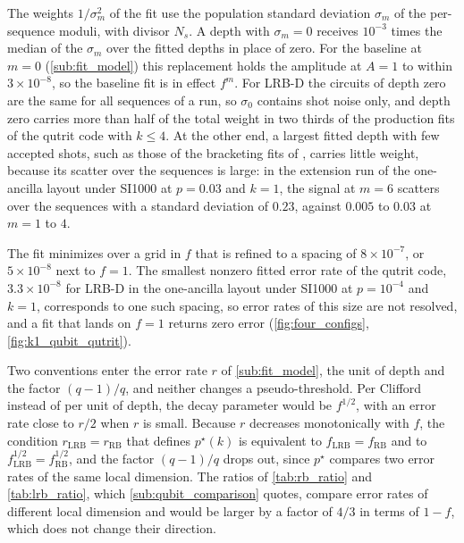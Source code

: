 The weights $1/\sigma_m^2$ of the fit use the population standard deviation $\sigma_m$ of the per-sequence moduli, with divisor $N_s$. A depth with $\sigma_m = 0$ receives $10^{-3}$ times the median of the $\sigma_m$ over the fitted depths in place of zero. For the baseline at $m = 0$ (\autoref{sub:fit_model}) this replacement holds the amplitude at $A = 1$ to within $3\times10^{-8}$, so the baseline fit is in effect $f^m$. For LRB-D the circuits of depth zero are the same for all sequences of a run, so $\sigma_0$ contains shot noise only, and depth zero carries more than half of the total weight in two thirds of the production fits of the qutrit code with $k \le 4$. At the other end, a largest fitted depth with few accepted shots, such as those of the bracketing fits of , carries little weight, because its scatter over the sequences is large: in the extension run of the one-ancilla layout under SI1000 at $p = 0.03$ and $k = 1$, the signal at $m = 6$ scatters over the sequences with a standard deviation of $0.23$, against $0.005$ to $0.03$ at $m = 1$ to $4$.

The fit minimizes over a grid in $f$ that is refined to a spacing of $8\times10^{-7}$, or $5\times10^{-8}$ next to $f = 1$. The smallest nonzero fitted error rate of the qutrit code, $3.3\times10^{-8}$ for LRB-D in the one-ancilla layout under SI1000 at $p = 10^{-4}$ and $k = 1$, corresponds to one such spacing, so error rates of this size are not resolved, and a fit that lands on $f = 1$ returns zero error (\autoref{fig:four_configs}, \autoref{fig:k1_qubit_qutrit}).

Two conventions enter the error rate $r$ of \autoref{sub:fit_model}, the unit of depth and the factor $(q-1)/q$, and neither changes a pseudo-threshold. Per Clifford instead of per unit of depth, the decay parameter would be $f^{1/2}$, with an error rate close to $r/2$ when $r$ is small. Because $r$ decreases monotonically with $f$, the condition $r_{\mathrm{LRB}} = r_{\mathrm{RB}}$ that defines $p^\star(k)$ is equivalent to $f_{\mathrm{LRB}} = f_{\mathrm{RB}}$ and to $f_{\mathrm{LRB}}^{1/2} = f_{\mathrm{RB}}^{1/2}$, and the factor $(q-1)/q$ drops out, since $p^\star$ compares two error rates of the same local dimension. The ratios of \autoref{tab:rb_ratio} and \autoref{tab:lrb_ratio}, which \autoref{sub:qubit_comparison} quotes, compare error rates of different local dimension and would be larger by a factor of $4/3$ in terms of $1 - f$, which does not change their direction.

